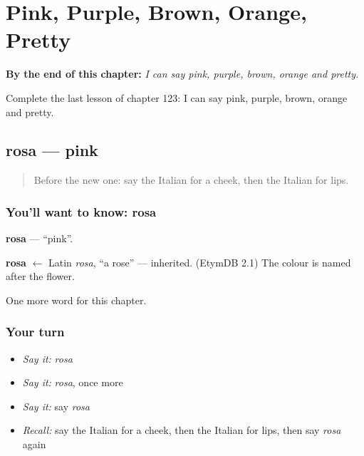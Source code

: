 
\chapter{Pink, Purple, Brown, Orange, Pretty}
\label{ch:it-pink-purple-brown-orange-pretty}

\begin{chapteropening}
\textbf{By the end of this chapter:} \emph{I can say pink, purple, brown, orange and pretty.}

Complete the last lesson of chapter 123: I can say pink, purple, brown, orange and pretty.
\end{chapteropening}

\section[rosa]{rosa — pink}

\label{lesson:IT-C123-rosa}



\begin{quote}
Before the new one: say the Italian for a cheek, then the Italian for lips.
\end{quote}

\subsection*{You'll want to know: rosa}
\textbf{rosa} — \textquotedblleft{}pink\textquotedblright{}.

\begin{cousinweb}
\textbf{rosa} $\leftarrow$ Latin \emph{rosa}, \textquotedblleft{}a rose\textquotedblright{} — inherited. (EtymDB 2.1) The colour is named after the flower.
\end{cousinweb}

\begin{grammarlens}[title={What you've built}]
One more word for this chapter.
\end{grammarlens}

\subsection*{Your turn}
\begin{itemize}
\raggedright
  \item \emph{Say it:} \emph{rosa}
  \item \emph{Say it:} \emph{rosa}, once more
  \item \emph{Say it:} say \emph{rosa}
  \item \emph{Recall:} say the Italian for a cheek, then the Italian for lips, then say \emph{rosa} again
\end{itemize}

